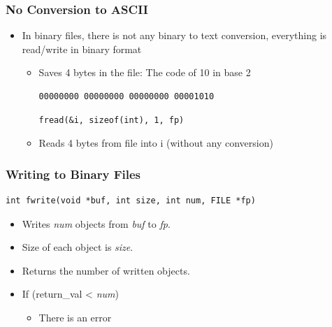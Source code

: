 \documentclass{../c-lecture}
\begin{document}
\begin{frame}[fragile]
  \frametitle{No Conversion to ASCII}
  \begin{itemize}
    \item
      In binary files, there is not any binary to text conversion, everything
      is read/write in binary format

    \begin{itemize}
      \begin{verbatim}
int i = 10;
fwrite(&i, sizeof(int), 1, fp)
      \end{verbatim}
      \item Saves 4 bytes in the file: The code of 10 in base 2
      \begin{verbatim}
00000000 00000000 00000000 00001010
      \end{verbatim}
      \begin{verbatim}
fread(&i, sizeof(int), 1, fp)
      \end{verbatim}
      \item Reads 4 bytes from file into i (without any conversion)
    \end{itemize}
  \end{itemize}
\end{frame}

\begin{frame}[fragile]
  \frametitle{Writing to Binary Files}
  \begin{verbatim}
int fwrite(void *buf, int size, int num, FILE *fp)
  \end{verbatim}
  \begin{itemize}
    \item
      Writes \textit{\color{YellowOrange} num} objects from
      \textit{\color{LimeGreen} buf} to \textit{\color{Violet} fp}.
    \item Size of each object is \textit{\color{Yellow} size}.
    \item Returns the number of written objects.
    \item If (return\_val < \textit{\color{YellowOrange} num})
    \begin{itemize}
      \item There is an error
    \end{itemize}
  \end{itemize}
\end{frame}
\end{document}
